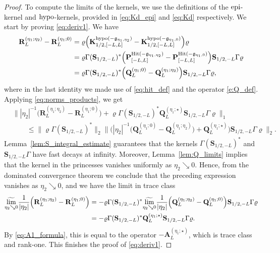 \documentclass[oneside,final,11pt]{amsart}
\theoremstyle{definition}
\newcommand\hit{\uptext{Hit}}
\newcommand{\fg}{\mathfrak{g}}
\newcommand{\mylim}[1]{\underset{#1}{\wt{\mathrm{lim}}}}
\newcommand{\1}[1]{\mathbf{1}_{#1}}
\newcommand{\wt}{\widetilde}
\newcommand{\uptext}[1]{\text{\upshape{#1}}}
\DeclareMathOperator{\epi}{\uptext{epi}}
\DeclareMathOperator{\hypo}{\uptext{hypo}}
\newcommand{\fT}{\mathbf{S}}
\newcommand{\fP}{\mathbf{P}}
\newcommand{\fQ}{\mathbf{Q}}
\newcommand{\fA}{\mathbf{A}}
\newcommand{\fK}{\mathbf{K}}
\newcommand{\fR}{\mathbf{R}}
\numberwithin{equation}{section}
\begin{document}
\begin{proof}
To compute the limits of the kernels, we use the definitions of the $\epi$-kernel and $\hypo$-kernels, provided in \eqref{eq:Kd_epi} and \eqref{eq:Kd} respectively. We start by proving \eqref{eq:deriv1}. We have %
\begin{align}
\fR_L^{(\eta_1; \eta_2)} - \fR_L^{(\eta_1; 0)} &= \varrho \Bigl(\fK^{\hypo(-\fg_{\eta_1, \eta_2})}_{1/2, [-L,L]} - \fK^{\hypo(-\fg_{\eta_1, 0})}_{1/2, [-L,L]}\Bigr) \varrho\\
& = \varrho \Gamma(\fT_{1/2,-L})^* \Bigl(\fP_{[-L,L]}^{\hit(-\fg_{\eta_1, \eta_2})} - \fP_{[-L,L]}^{\hit(-\fg_{\eta_1, 0})}\Bigr)\fT_{1/2,-L} \Gamma \varrho\\
& = \varrho\Gamma(\fT_{1/2,-L})^* \Bigl(\fQ_L^{(\eta_1; 0)} - \fQ_L^{(\eta_1; \eta_2)}\Bigr) \fT_{1/2,-L} \Gamma \varrho,\label{e:kernel_d2}
\end{align}
where in the last identity we made use of \eqref{eq:hit_def} and the operator \eqref{e:Q_def}. Applying \eqref{eq:norms_products}, we get 
\begin{align}
&\bigl\| |\eta_2|^{-1} \bigl(\fR_L^{(\eta_1; \eta_2)} - \fR_L^{(\eta_1; 0)}\bigr) + \varrho\Gamma(\fT_{1/2,-L})^* \fQ_L^{(\eta_1; \star)} \fT_{1/2,-L} \Gamma\varrho \bigr\|_1 \\
&\qquad \leq \bigl\| \varrho\Gamma(\fT_{1/2,-L})^* \bigr\|_2 \bigl\| \bigl(|\eta_2|^{-1} \bigl(\fQ_L^{(\eta_1; 0)} - \fQ_L^{(\eta_1; \eta_2)}\bigr) + \fQ_L^{(\eta_1; \star)}\bigr) \fT_{1/2,-L} \Gamma \varrho \bigr\|_2.
\end{align}
Lemma~\ref{lem:S_integral_estimate} guarantees that the kernels $\Gamma(\fT_{1/2,-L})^*$ and $\fT_{1/2,-L} \Gamma$ have fast decays at infinity. Moreover, Lemma~\ref{lem:Q_limits} implies that the kernel in the princesses vanishes uniformly as $\eta_2 \searrow 0$. Hence, from the dominated convergence theorem we conclude that the preceding expression vanishes as $\eta_2 \searrow 0$, and we have the limit in trace class
\begin{align}
\mylim{\eta_2 \searrow 0} \frac{1}{|\eta_2|} \Bigl( \fR_L^{(\eta_1; \eta_2)} - \fR_L^{(\eta_1; 0)}\Bigr) &= - \varrho\Gamma (\fT_{1/2,-L})^* \mylim{\eta_2 \searrow 0} \frac{1}{|\eta_2|} \Bigl(\fQ_L^{(\eta_1; \eta_2)} - \fQ_L^{(\eta_1; 0)}\Bigr) \fT_{1/2,-L} \Gamma \varrho \\
&= - \varrho\Gamma(\fT_{1/2,-L})^* \fQ_L^{(\eta_1; \star)} \fT_{1/2,-L} \Gamma\varrho.\label{eq:limit1}
\end{align}
By \eqref{eq:A1_formula}, this is equal to the operator $-\fA_L^{(\eta_1; \star)}$, which is trace class and rank-one.
This finishes the proof of \eqref{eq:deriv1}.


\end{proof}
\end{document}
